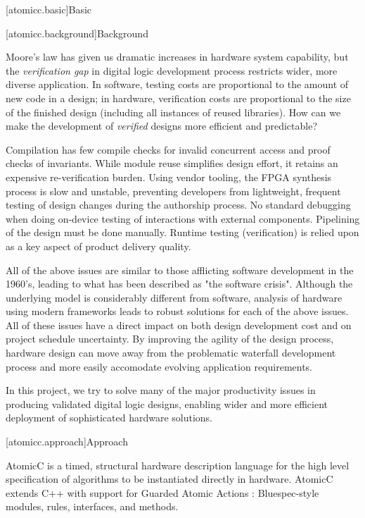 [atomicc.basic]{Basic}

[atomicc.background]{Background}

Moore's law has given us
dramatic increases in hardware system capability,
but the \textit{verification gap} in digital logic development process restricts wider,
more diverse application.
In software, testing costs are proportional to the amount of new code in a design;
in hardware, verification costs are proportional to the size of the finished design (including
all instances of reused libraries).
How can we make the development of 
\textit{verified} designs more efficient and predictable?

Compilation has few compile checks for invalid concurrent access and proof checks of invariants.
While module reuse simplifies design effort, it retains
an expensive re-verification burden.  Using vendor tooling,
the FPGA synthesis process is slow and unstable, preventing developers
from lightweight, frequent testing of design changes during the
authorship process.
No standard debugging when doing on-device testing of interactions
with external components.
Pipelining of the design must be done manually.
Runtime testing (verification) is relied upon as a key aspect
of product delivery quality.

All of the above issues are similar to those afflicting software development
in the 1960's, leading to what has been described as "the software crisis".
Although the underlying model is considerably different from software,
analysis of hardware using modern frameworks
leads to robust solutions for each of the above issues.
All of these issues have a direct impact on both design development cost
and on project schedule uncertainty.  By improving the agility of the design
process, hardware design can move away from the problematic waterfall development
process and more easily accomodate evolving application requirements.

In this project, we try to solve many of the major
productivity issues in producing validated digital logic designs,
enabling wider and more efficient deployment of sophisticated
hardware solutions.

[atomicc.approach]{Approach}

AtomicC is a timed, structural hardware description language for
the high level specification of algorithms to be instantiated
directly in hardware.
AtomicC extends C++
with support for Guarded Atomic Actions
\cite{Hoe:Thesis,HoeArvind:TRSSynthesis2,Dave2007}:
Bluespec-style\cite{Bluespec:www}
modules, rules, interfaces, and methods.

